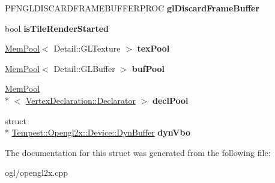 \begin{DoxyCompactItemize}
\item 
\hypertarget{struct_tempest_1_1_opengl2x_1_1_device_ae73a3be13b7a11fc10334af932fb221b}{P\+F\+N\+G\+L\+D\+I\+S\+C\+A\+R\+D\+F\+R\+A\+M\+E\+B\+U\+F\+F\+E\+R\+P\+R\+O\+C {\bfseries gl\+Discard\+Frame\+Buffer}}\label{struct_tempest_1_1_opengl2x_1_1_device_ae73a3be13b7a11fc10334af932fb221b}

\item 
\hypertarget{struct_tempest_1_1_opengl2x_1_1_device_a30afae01a1256afd847c50e30881e799}{bool {\bfseries is\+Tile\+Render\+Started}}\label{struct_tempest_1_1_opengl2x_1_1_device_a30afae01a1256afd847c50e30881e799}

\item 
\hypertarget{struct_tempest_1_1_opengl2x_1_1_device_aec160213c978bcaed2491c70dc5219f8}{\hyperlink{class_tempest_1_1_mem_pool}{Mem\+Pool}$<$ Detail\+::\+G\+L\+Texture $>$ {\bfseries tex\+Pool}}\label{struct_tempest_1_1_opengl2x_1_1_device_aec160213c978bcaed2491c70dc5219f8}

\item 
\hypertarget{struct_tempest_1_1_opengl2x_1_1_device_a7cb68bb6e252045d8fe8aa2532db09ce}{\hyperlink{class_tempest_1_1_mem_pool}{Mem\+Pool}$<$ Detail\+::\+G\+L\+Buffer $>$ {\bfseries buf\+Pool}}\label{struct_tempest_1_1_opengl2x_1_1_device_a7cb68bb6e252045d8fe8aa2532db09ce}

\item 
\hypertarget{struct_tempest_1_1_opengl2x_1_1_device_a286309edd3eb7ec24f9b051a7413df5f}{\hyperlink{class_tempest_1_1_mem_pool}{Mem\+Pool}\\*
$<$ \hyperlink{class_tempest_1_1_vertex_declaration_1_1_declarator}{Vertex\+Declaration\+::\+Declarator} $>$ {\bfseries decl\+Pool}}\label{struct_tempest_1_1_opengl2x_1_1_device_a286309edd3eb7ec24f9b051a7413df5f}

\item 
\hypertarget{struct_tempest_1_1_opengl2x_1_1_device_afd4da4857c78cee59b0ff40a9ba77abb}{struct \\*
\hyperlink{struct_tempest_1_1_opengl2x_1_1_device_1_1_dyn_buffer}{Tempest\+::\+Opengl2x\+::\+Device\+::\+Dyn\+Buffer} {\bfseries dyn\+Vbo}}\label{struct_tempest_1_1_opengl2x_1_1_device_afd4da4857c78cee59b0ff40a9ba77abb}

\end{DoxyCompactItemize}


The documentation for this struct was generated from the following file\+:\begin{DoxyCompactItemize}
\item 
ogl/opengl2x.\+cpp\end{DoxyCompactItemize}
